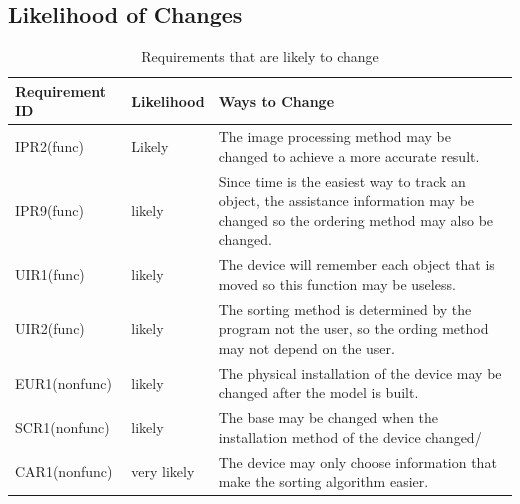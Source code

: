 \documentclass[12pt]{article}
\begin{document}
\subsection{Likelihood of Changes}
\begin{table}[H]
\begin{tabular}{|p{}|p{}|p{}|}

\hline Requirement ID&Likelihood&Ways to Change\\

\hline IPR2(func)&Likely&The image processing method may be changed to achieve a more accurate result.\\

\hline IPR9(func)&likely&Since time is the easiest way to track an object, the assistance information may be changed so the ordering method may also be changed.\\

\hline UIR1(func)&likely&The device will remember each object that is moved so this function may be useless.\\

\hline UIR2(func)&likely&The sorting method is determined by the program not the user, so the ording method may not depend on the user. \\

\hline EUR1(nonfunc)&likely&The physical installation of the device may be changed after the model is built.\\

\hline SCR1(nonfunc)&likely&The base may be changed when the installation method of the device changed/\\

\hline CAR1(nonfunc)&very likely&The device may only choose information that make the sorting algorithm easier.\\

\hline

\end{tabular}
\caption{Requirements that are likely to change}
\end{table}
\end{document}
